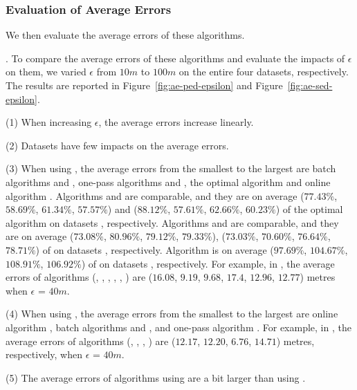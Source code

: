 \subsubsection{Evaluation of Average Errors}
We then evaluate the average errors of these algorithms.





.
To compare the average errors of these algorithms and evaluate the impacts of $\epsilon$ on them, we varied $\epsilon$ from $10m$ to $100m$ on the entire four datasets, respectively.
The results are reported in Figure~\ref{fig:ae-ped-epsilon} and Figure~\ref{fig:ae-sed-epsilon}.


\sstab (1) When increasing $\epsilon$, the average errors increase linearly. 

\sstab (2) Datasets have few impacts on the average errors.

\sstab (3) When using \ped, the average errors from the smallest
to the largest are batch algorithms \tpa and \dpa, one-pass
algorithms \siped and \operb, the optimal algorithm \optp and online algorithm \bqsa. 
Algorithms \tpa and
\dpa are comparable, and they are on average ($77.43\%$, $58.69\%$, $61.34\%$,
$57.57\%$) and ($88.12\%$, $57.61\%$, $62.66\%$, $60.23\%$) of the optimal algorithm \optp on datasets \dSets, respectively.
Algorithms \siped and \operb are comparable, and they are on average
($73.08\%$, $80.96\%$, $79.12\%$, $79.33\%$), ($73.03\%$, $70.60\%$, $76.64\%$, $78.71\%$) of \optp on datasets \dSets, respectively.
Algorithm \bqsa is on average ($97.69\%$, $104.67\%$, $108.91\%$, $106.92\%$) of \optp on datasets \dSets, respectively.
%
For example, in \mopsi, the average errors of algorithms
(\optp, \tpa, \dpa, \bqsa, \siped, \operb ) are ($16.08$, $9.19$, $9.68$, $17.4$, $12.96$, $12.77$)  metres when $\epsilon$ = $40m$.

\sstab (4) When using \sed, the average errors from the smallest
to the largest are online algorithm \squishe, batch algorithms \tpa and \dpa,
and one-pass algorithm \cised.
For example, in \mopsi, the average errors of algorithms
(\tpa, \dpa, \squishe, \cised) are ($12.17$, $12.20$, $6.76$, $14.71$) metres, respectively, when $\epsilon$ = $40m$.

\sstab (5) The average errors of algorithms using \sed are a bit larger than using \ped. 


